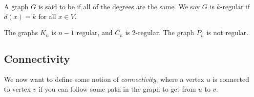 \documentclass[a4paper]{scrreprt}
\begin{document}

\begin{definition}[Regularity]
	A graph $G$ is said to be  if all of the degrees are the same. We say $G$ is $k$-regular if $d(x) = k$ for all $x \in V$.
\end{definition}

\begin{example}
	The graphs $K_n$ is $n - 1$ regular, and $C_n$ is $2$-regular.
	The graph $P_n$ is not regular.
\end{example}

\subsection{Connectivity}

We now want to define some notion of \emph{connectivity}, where a vertex $u$ is connected to vertex $v$ if you can follow some path in the graph to get from $u$ to $v$.
\end{document}

